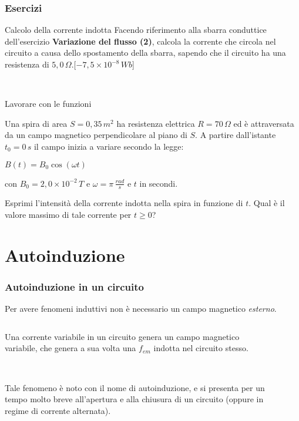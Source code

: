 \documentclass[]{beamer}
\theoremstyle{plain}
\newcommand{\fem}{f_{em}}
\begin{document}
\begin{frame}
\frametitle{Esercizi}
\begin{exampleblock}{Calcolo della corrente indotta}
  \small{
  Facendo riferimento alla sbarra conduttice dell'esercizio \textbf{Variazione del flusso (2)}, calcola la corrente che circola nel circuito a causa dello spostamento della sbarra, sapendo che il circuito ha una resistenza di $ 5,0 \, \Omega $.\hspace*{\fill}[$ -7,5 \times 10^{-8} \, Wb $]}
\end{exampleblock}

~

\begin{exampleblock}{Lavorare con le funzioni}
  \small{
    Una spira di area $ S = 0,35 \, m^2 $ ha resistenza elettrica $ R = 70 \, \Omega $ ed è attraversata da un campo magnetico perpendicolare al piano di $ S $. A partire dall’istante $ t_0 = 0 \, s $ il campo inizia a variare secondo la legge:
    \begin{center}
      $ B(t) = B_0 \cos (\omega t) $
    \end{center}
    con $ B_0 = 2,0 \times 10^{-2} \, T  $ e $ \omega = \pi \, \frac{rad}{s} $ e $ t $ in secondi.
    
    Esprimi l’intensità della corrente indotta nella spira in funzione di $ t $. Qual è il valore massimo di tale corrente per $ t \geq 0 $?}
\end{exampleblock}
\end{frame}


\section{Autoinduzione}

\begin{frame}
\frametitle{Autoinduzione in un circuito}
Per avere fenomeni induttivi non è necessario un campo magnetico \emph{esterno}.\pause

\begin{columns}
\begin{column}{.55\textwidth}
  Una corrente variabile in un circuito genera un campo magnetico variabile, che genera a sua volta una $ \fem $ indotta nel circuito stesso.\pause

~

Tale fenomeno è noto con il nome di \alert{autoinduzione}, e si presenta per un tempo molto breve all'apertura e alla chiusura di un circuito (oppure in regime di corrente alternata).
\end{column}
\begin{column}{.35\textwidth}
  \begin{figure}
  \end{figure}
\end{column}
\end{columns}
\end{frame}
\end{document}
